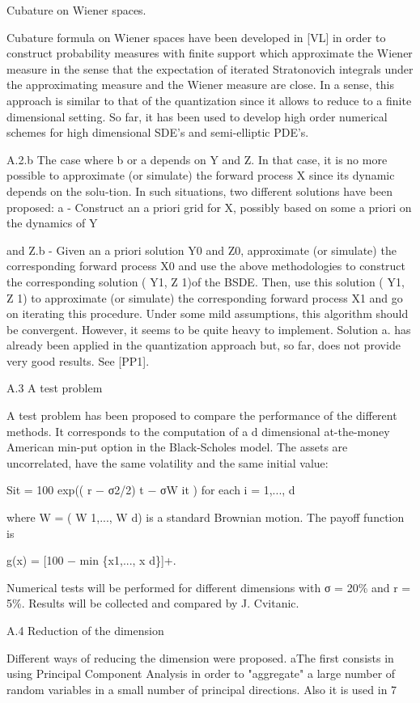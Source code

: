 \documentclass[11pt]{article}
\begin{document}
Cubature on Wiener spaces.

Cubature formula on Wiener spaces have been developed in [VL] in order to construct probability measures with finite support which approximate the Wiener measure in the sense that the expectation of iterated Stratonovich integrals under the approximating measure and the Wiener measure are close. In a sense, this approach is similar to that of the quantization since it allows to reduce to a finite dimensional setting. So far, it has been used to develop high order numerical schemes for high dimensional SDE's and semi-elliptic PDE's.

A.2.b The case where b or a depends on Y and Z. In that case, it is no more possible to approximate (or simulate) the forward process X since its dynamic depends on the solu-tion. In such situations, two different solutions have been proposed: a - Construct an a priori grid for X, possibly based on some a priori on the dynamics of Y

and Z.b - Given an a priori solution Y0 and Z0, approximate (or simulate) the corresponding forward process X0 and use the above methodologies to construct the corresponding solution ( Y1, Z 1)of the BSDE. Then, use this solution ( Y1, Z 1) to approximate (or simulate) the corresponding forward process X1 and go on iterating this procedure. Under some mild assumptions, this algorithm should be convergent. However, it seems to be quite heavy to implement. Solution a. has already been applied in the quantization approach but, so far, does not provide very good results. See [PP1].

A.3 A test problem

A test problem has been proposed to compare the performance of the different methods. It corresponds to the computation of a d dimensional at-the-money American min-put option in the Black-Scholes model. The assets are uncorrelated, have the same volatility and the same initial value:

Sit = 100 exp(( r − σ2/2) t − σW it ) for each i = 1,..., d

where W = ( W 1,..., W d) is a standard Brownian motion. The payoff function is

g(x) = [100 − min \{x1,..., x d\}]+.

Numerical tests will be performed for different dimensions with σ = 20\% and r = 5\%. Results will be collected and compared by J. Cvitanic.

A.4 Reduction of the dimension

Different ways of reducing the dimension were proposed. aThe first consists in using Principal Component Analysis in order to "aggregate" a large number of random variables in a small number of principal directions. Also it is used in 7
\end{document}
